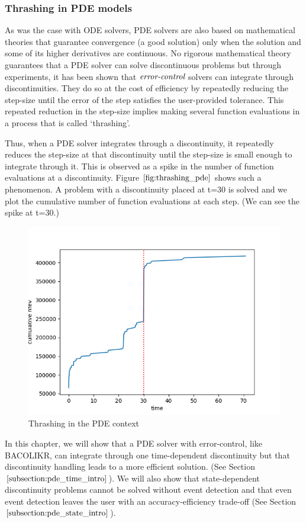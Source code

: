 \documentclass{article}
\begin{document}
\subsubsection{Thrashing in PDE models}
\label{subsection:pde_thrashing}
As was the case with ODE solvers, PDE solvers are also based on mathematical theories that guarantee convergence (a good solution) only when the solution and some of its higher derivatives are continuous. No rigorous mathematical theory guarantees that a PDE solver can solve discontinuous problems but through experiments, it has been shown that $\emph{error-control}$ solvers can integrate through discontinuities. They do so at the cost of efficiency by repeatedly reducing the step-size until the error of the step satisfies the user-provided tolerance. This repeated reduction in the step-size implies making several function evaluations in a process that is called `thrashing'.

Thus, when a PDE solver integrates through a discontinuity, it repeatedly reduces the step-size at that discontinuity until the step-size is small enough to integrate through it. This is observed as a spike in the number of function evaluations at a discontinuity. Figure $\ref{fig:thrashing_pde}$ shows such a phenomenon. A problem with a discontinuity placed at t=30 is solved and we plot the cumulative number of function evaluations at each step. (We can see the spike at t=30.)
\begin{figure}[H]
\centering
\includegraphics[width=0.7\linewidth]{./figures/pde_thrashing}
\caption{Thrashing in the PDE context}
\label{fig:thrashing_pde}
\end{figure}

In this chapter, we will show that a PDE solver with error-control, like BACOLIKR, can integrate through one time-dependent discontinuity but that discontinuity handling leads to a more efficient solution.
(See Section $\ref{subsection:pde_time_intro}$). We will also show that state-dependent discontinuity problems cannot be solved without event detection and that even event detection leaves the user with an accuracy-efficiency trade-off (See Section $\ref{subsection:pde_state_intro}$).
\end{document}
